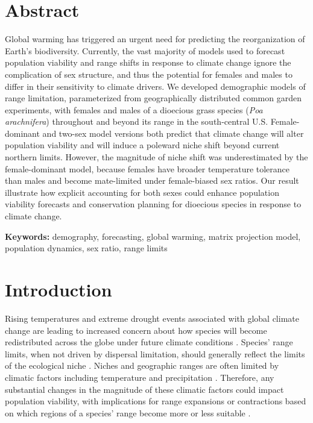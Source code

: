 \documentclass[12pt]{article}\usepackage[]{graphicx}\usepackage[dvipsnames]{xcolor}
\begin{document}
\section*{Abstract}
Global warming has triggered an urgent need for predicting the reorganization of Earth's biodiversity.
Currently, the  vast majority of models used to forecast population viability and range shifts in response to climate change ignore the  complication of sex structure, and thus the potential for females and males to differ in their sensitivity to climate drivers. 
We developed demographic models of range limitation, parameterized from geographically distributed common garden experiments, with females and males of a dioecious grass species (\textit{Poa arachnifera}) throughout and beyond its range in the south-central U.S. 
Female-dominant and two-sex model versions both predict that  climate change will alter population viability and will induce a poleward niche shift beyond current northern limits.
However, the magnitude of niche shift was underestimated by the female-dominant model, because females have broader temperature tolerance than males and become mate-limited under female-biased sex ratios.
Our result illustrate how explicit accounting for both sexes could enhance population viability forecasts and conservation planning for dioecious species in response to climate change.

\bigskip
\noindent\textbf{Keywords:} demography, forecasting, global warming, matrix projection model, population dynamics, sex ratio, range limits

\newpage
\section*{Introduction}
Rising temperatures and extreme drought events associated with global climate change are leading to increased concern about how species will become redistributed across the globe under future climate conditions \citep{bertrand2011changes,gamelon2017interactions,smith2024extreme}.
Species' range limits, when not driven by dispersal limitation, should generally reflect the limits of the ecological niche \citep{lee2016synthesis}.
Niches and geographic ranges are often limited by climatic factors including temperature and precipitation \citep{sexton2009evolution}. 
Therefore, any substantial changes in the magnitude of these climatic factors could impact population viability, with implications for range expansions or contractions based on which regions of a species' range become more or less suitable  \citep{davis2001range, pease1989model}. 
\end{document}
